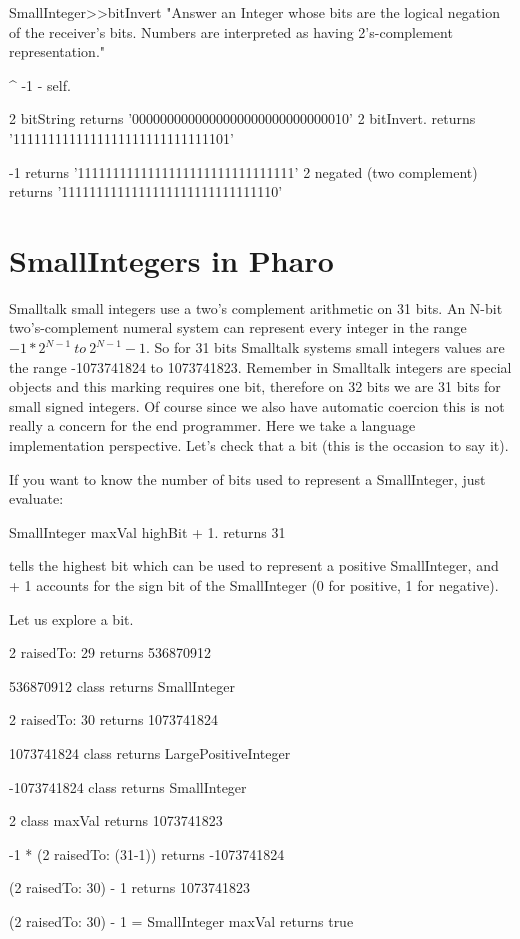 \documentclass[a4paper,10pt,twoside]{book}
\begin{document}
\begin{code}{}
SmallInteger>>bitInvert
    "Answer an Integer whose bits are the logical negation of the receiver's bits.
    Numbers are interpreted as having 2's-complement representation."

	^ -1 - self.
\end{code}

\begin{code}{}
2 bitString
	returns '0000000000000000000000000000010'
2 bitInvert.
	returns '1111111111111111111111111111101'
	
-1 
	returns '1111111111111111111111111111111'
2 negated (two complement)
	returns '1111111111111111111111111111110'
\end{code}


\section{SmallIntegers in Pharo}

Smalltalk small integers use a two's complement arithmetic on 31 bits.  An N-bit two's-complement numeral system can represent every integer in the range $-1 * 2^{N-1}\ to\ 2^{N-1}-1$. So for 31 bits Smalltalk systems small integers values are the range -1073741824 to  1073741823.  Remember in Smalltalk integers are special objects and this marking requires one bit, therefore on 32 bits we are 31 bits for small signed integers. Of course since we also have automatic coercion this is not really a concern for the end programmer. Here we take a language implementation perspective.
 Let's check that a bit (this is the occasion to say it). 

If you want to know the number of bits used to represent a
SmallInteger, just evaluate:

\begin{code}
SmallInteger maxVal highBit + 1.
	returns 31
\end{code}

 tells the highest bit which can be used to
represent a positive SmallInteger, and + 1 accounts for the sign bit
of the SmallInteger (0 for positive, 1 for negative).


Let us explore a bit. 

\begin{code}{}
2 raisedTo: 29 
	returns 536870912 

536870912 class
	returns SmallInteger

2 raisedTo: 30 
	returns 1073741824

1073741824 class
	returns LargePositiveInteger

-1073741824 class 
	returns SmallInteger

2 class maxVal 
	returns 1073741823

-1 * (2 raisedTo: (31-1)) 
	returns -1073741824
	
(2 raisedTo: 30) - 1
	returns 1073741823
	
(2 raisedTo: 30) - 1 = SmallInteger maxVal	
	returns true
\end{code}
\end{document}
